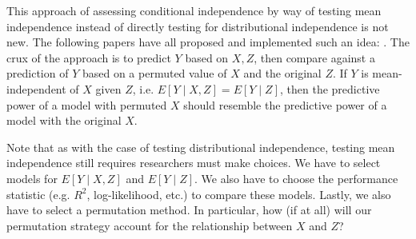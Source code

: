 This approach of assessing conditional independence by way of testing mean independence instead of directly testing for distributional independence is not new.
The following papers have all proposed and implemented such an idea: \citet{burkart_2017_predictive, chalupka_2018_fast, inacio_2019_conditional}.
The crux of the approach is to predict $Y$ based on $X, Z$, then compare against a prediction of $Y$ based on a permuted value of $X$ and the original $Z$.
If $Y$ is mean-independent of $X$ given $Z$, i.e. $E \left[ Y \mid X, Z \right] = E\left[ Y \mid Z \right]$, then the predictive power of a model with permuted $X$ should resemble the predictive power of a model with the original $X$.

Note that as with the case of testing distributional independence, testing mean independence still requires researchers must make choices.
We have to select models for $E \left[ Y \mid X, Z \right]$ and $E\left[ Y \mid Z \right]$.
We also have to choose the performance statistic (e.g. $R^2$, log-likelihood, etc.) to compare these models.
Lastly, we also have to select a permutation method.
In particular, how (if at all) will our permutation strategy account for the relationship between $X$ and $Z$?


